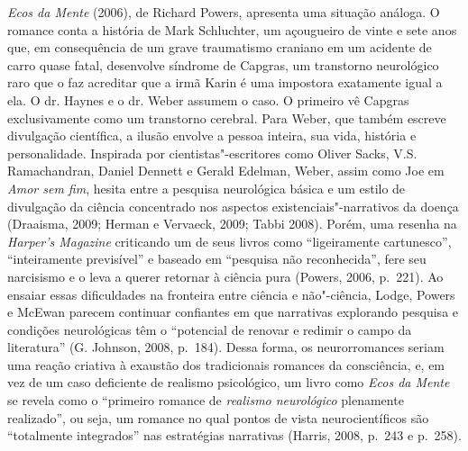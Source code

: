 \emph{Ecos da Mente} (2006), de Richard Powers, apresenta uma situação
análoga. O romance conta a história de Mark Schluchter, um açougueiro de
vinte e sete anos que, em consequência de um grave traumatismo craniano
em um acidente de carro quase fatal, desenvolve síndrome de Capgras, um
transtorno neurológico raro que o faz acreditar que a irmã Karin é uma
impostora exatamente igual a ela. O dr. Haynes e o dr. Weber assumem o
caso. O primeiro vê Capgras exclusivamente como um transtorno cerebral.
Para Weber, que também escreve divulgação científica, a ilusão envolve a
pessoa inteira, sua vida, história e personalidade. Inspirada por
cientistas"-escritores como Oliver Sacks, V.S. Ramachandran, Daniel
Dennett e Gerald Edelman, Weber, assim como Joe em \emph{Amor sem fim},
hesita entre a pesquisa neurológica básica e um estilo de divulgação da
ciência concentrado nos aspectos existenciais"-narrativos da doença
(Draaisma, 2009; Herman e Vervaeck, 2009; Tabbi 2008). Porém, uma
resenha na \emph{Harper's Magazine} criticando um de seus livros como
``ligeiramente cartunesco'', ``inteiramente previsível'' e baseado em
``pesquisa não reconhecida'', fere seu narcisismo e o leva a querer
retornar à ciência pura (Powers, 2006, p.~221). Ao ensaiar essas
dificuldades na fronteira entre ciência e não"-ciência, Lodge, Powers e
McEwan parecem continuar confiantes em que narrativas explorando
pesquisa e condições neurológicas têm o ``potencial de renovar e redimir
o campo da literatura'' (G. Johnson, 2008, p.~184). Dessa forma, os
neurorromances seriam uma reação criativa à exaustão dos tradicionais
romances da consciência, e, em vez de um caso deficiente de realismo
psicológico, um livro como \emph{Ecos da Mente} se revela como o
``primeiro romance de \emph{realismo neurológico} plenamente
realizado'', ou seja, um romance no qual pontos de vista
neurocientíficos são ``totalmente integrados'' nas estratégias
narrativas (Harris, 2008, p.~243 e p.~258).

